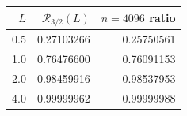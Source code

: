 \begin{tabular}{rrr}
\toprule
$L$ & $\mathcal R_{3/2}(L)$ & $n=4096$ ratio \\
\midrule
0.5 & 0.27103266 & 0.25750561 \\
1.0 & 0.76476600 & 0.76091153 \\
2.0 & 0.98459916 & 0.98537953 \\
4.0 & 0.99999962 & 0.99999988 \\
\bottomrule
\end{tabular}

